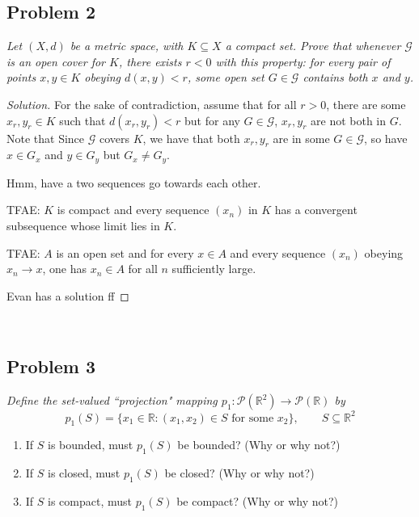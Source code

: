 \documentclass{article}
\newcommand{\R}{{\mathbb R}}
\begin{document}
\subsection*{Problem 2}
{\it Let $(X, d)$ be a metric space, with $K \subseteq X$ a compact set.
Prove that whenever $\mathcal{G}$ is an open cover for $K$,
there exists $r < 0$ with this property:
for every pair of points $x,y \in K$ obeying $d(x,y) < r$,
some open set $G \in \mathcal{G}$ contains both $x$ and $y$.}

\begin{proof}[Solution]\let\qed\relax
	For the sake of contradiction,
	assume that for all $r>0$, there are some $x_r,y_r \in K$ such that $d(x_r,y_r) <r$
	but for any $G \in \mathcal{G}$, $x_r,y_r$ are not both in $G$.
	Note that 
	Since $\mathcal{G}$ covers $K$,
	we have that both $x_r,y_r$ are in some $G \in \mathcal{G}$,
	so have $x \in G_x$ and $y \in G_y$ but $G_x \neq G_y$.

	Hmm, have a two sequences go towards each other.

	TFAE: $K$ is compact and every sequence $(x_n)$ in $K$ has
	a convergent subsequence whose limit lies in $K$.

	TFAE: $A$ is an open set and for every $x \in A$ and every sequence
	$(x_n)$ obeying $x_n \to x$, one has $x_n \in A$ for all $n$ sufficiently large.

	Evan has a solution ff
\end{proof}
\clearpage
~\clearpage

\subsection*{Problem 3}
{\it Define the set-valued ``projection" mapping
$p_1 \colon \mathcal{P}(\R^2) \to \mathcal{P}(\R)$ by
\[
	p_1(S) = \{x_1 \in \R \colon (x_1,x_2) \in S \text{ for some }x_2\},
	\qquad S \subseteq \R^2
\]
\begin{enumerate}
	\item If $S$ is bounded, must $p_1(S)$ be bounded? (Why or why not?)
	\item If $S$ is closed, must $p_1(S)$ be closed? (Why or why not?)
	\item If $S$ is compact, must $p_1(S)$ be compact? (Why or why not?)
\end{enumerate}}
\end{document}
